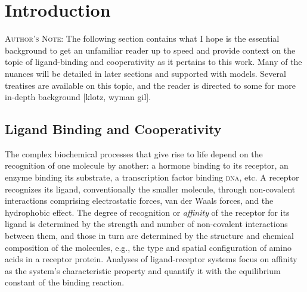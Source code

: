 \documentclass{article}
\numberwithin{equation}{section}
\begin{document}
\renewcommand{\thefootnote}{\fnsymbol{footnote}}

\section{Introduction}

\textsc{Author's Note}: The following section contains what I hope is the essential background to get an unfamiliar reader up to speed and provide context on the topic of ligand-binding and cooperativity as it pertains to this work. Many of the nuances will be detailed in later sections and supported with models. Several treatises are available on this topic, and the reader is directed to some for more in-depth background [klotz, wyman gil].

\subsection*{Ligand Binding and Cooperativity}

The complex biochemical processes that give rise to life depend on the recognition of one molecule by another: a hormone binding to its receptor, an enzyme binding its substrate, a transcription factor binding \textsc{dna}, etc. A receptor recognizes its ligand, conventionally the smaller molecule, through non-covalent interactions comprising electrostatic forces, van der Waals forces, and the hydrophobic effect. The degree of recognition or \emph{affinity} of the receptor for its ligand is determined by the strength and number of non-covalent interactions between them, and those in turn are determined by the structure and chemical composition of the molecules, e.g., the type and spatial configuration of amino acids in a receptor protein. Analyses of ligand-receptor systems focus on affinity as the system's characteristic property and quantify it with the equilibrium constant of the binding reaction.
\end{document}
